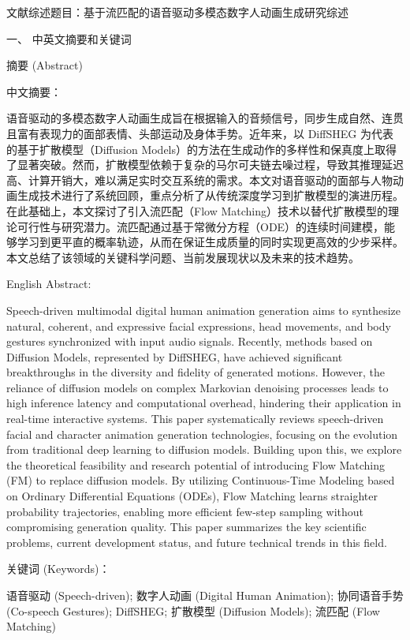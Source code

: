 \documentclass[UTF8]{ctexart}
\author{}
\date{}
\begin{document}
文献综述题目：基于流匹配的语音驱动多模态数字人动画生成研究综述

一、 中英文摘要和关键词

摘要 (Abstract)

中文摘要：

语音驱动的多模态数字人动画生成旨在根据输入的音频信号，同步生成自然、连贯且富有表现力的面部表情、头部运动及身体手势。近年来，以
DiffSHEG 为代表的基于扩散模型（Diffusion
Models）的方法在生成动作的多样性和保真度上取得了显著突破。然而，扩散模型依赖于复杂的马尔可夫链去噪过程，导致其推理延迟高、计算开销大，难以满足实时交互系统的需求。本文对语音驱动的面部与人物动画生成技术进行了系统回顾，重点分析了从传统深度学习到扩散模型的演进历程。在此基础上，本文探讨了引入流匹配（Flow
Matching）技术以替代扩散模型的理论可行性与研究潜力。流匹配通过基于常微分方程（ODE）的连续时间建模，能够学习到更平直的概率轨迹，从而在保证生成质量的同时实现更高效的少步采样。本文总结了该领域的关键科学问题、当前发展现状以及未来的技术趋势。

English Abstract:

Speech-driven multimodal digital human animation generation aims to
synthesize natural, coherent, and expressive facial expressions, head
movements, and body gestures synchronized with input audio signals.
Recently, methods based on Diffusion Models, represented by DiffSHEG,
have achieved significant breakthroughs in the diversity and fidelity of
generated motions. However, the reliance of diffusion models on complex
Markovian denoising processes leads to high inference latency and
computational overhead, hindering their application in real-time
interactive systems. This paper systematically reviews speech-driven
facial and character animation generation technologies, focusing on the
evolution from traditional deep learning to diffusion models. Building
upon this, we explore the theoretical feasibility and research potential
of introducing Flow Matching (FM) to replace diffusion models. By
utilizing Continuous-Time Modeling based on Ordinary Differential
Equations (ODEs), Flow Matching learns straighter probability
trajectories, enabling more efficient few-step sampling without
compromising generation quality. This paper summarizes the key
scientific problems, current development status, and future technical
trends in this field.

关键词 (Keywords)：

语音驱动 (Speech-driven); 数字人动画 (Digital Human Animation);
协同语音手势 (Co-speech Gestures); DiffSHEG; 扩散模型 (Diffusion
Models); 流匹配 (Flow Matching)
\end{document}

